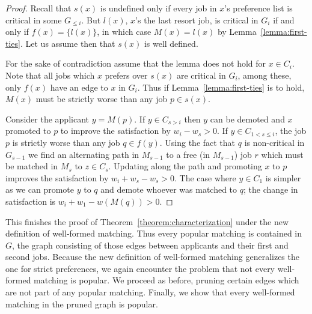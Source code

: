 \documentclass[11pt]{article}
\newcommand{\first}{f}
\newcommand{\second}{s}
\begin{document}
\begin{proof} Recall that $\second(x)$ is undefined only if every job in $x$'s preference list is critical in some $G_{\leq i}$. But $l(x)$, $x$'s the last resort job, is critical in $G_i$ if and only if $\first(x) = \{ l(x) \}$, in which case $M(x) = l(x)$ by Lemma~\ref{lemma:first-ties}. Let us assume then that $s(x)$ is well defined.

For the sake of contradiction assume that the lemma does not hold for $x \in C_i$. Note that all jobs which $x$ prefers over $\second(x)$ are critical in $G_i$, among these, only $\first(x)$ have an edge to $x$ in $G_i$. Thus if Lemma~\ref{lemma:first-ties} is to hold, $M(x)$ must be strictly worse than any job $p \in \second(x)$.

Consider the applicant $y = M(p)$. If $y \in C_{s> i}$ then $y$ can be demoted and $x$ promoted to $p$ to improve the satisfaction by $w_i - w_s > 0$. If $y \in C_{1<s\leq i}$, the job $p$ is strictly worse than any job $q \in \first(y)$. Using the fact that $q$ is non-critical in $G_{s-1}$ we find an alternating path in $M_{s-1}$ to a free (in $M_{s-1}$) job $r$ which must be matched in $M_s$ to $z \in C_s$. Updating along the path and promoting $x$ to $p$ improves the satisfaction by $w_i + w_s - w_s > 0$. The case where $y \in C_1$ is simpler as we can promote $y$ to $q$ and demote whoever was matched to $q$; the change in satisfaction is $w_i + w_1 - w(M(q)) > 0$.
\end{proof}

This finishes the proof of Theorem~\ref{theorem:characterization} under the new definition of well-formed matching. Thus every popular matching is contained in $G$, the graph consisting of those edges between applicants and their first and second jobs. Because the new definition of well-formed matching generalizes the one for strict preferences, we again encounter the problem that not every well-formed matching is popular. We proceed as before, pruning certain edges which are not part of any popular matching. Finally, we show that every well-formed matching in the pruned graph is popular.
\end{document}
